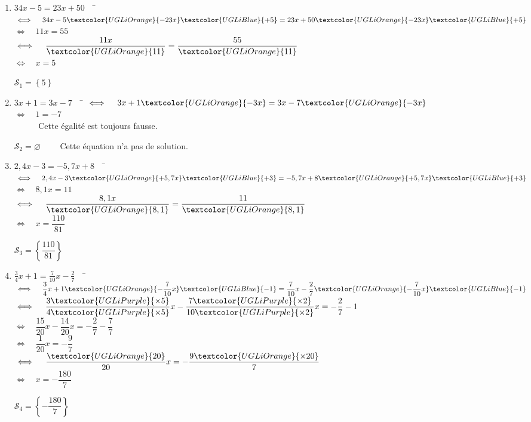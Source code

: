 \documentclass[a4paper,11pt,exos]{nsi} %
\begin{document}
\begin{enumerate}
    \item \begin{tabbing}
        $34x-5=23x+50 \quad$  \=  $\iff \quad 34x-5\textcolor{UGLiOrange}{-23x}\textcolor{UGLiBlue}{+5}=23x+50\textcolor{UGLiOrange}{-23x}\textcolor{UGLiBlue}{+5}$\\
        \>  $\iff \quad 11x=55$\\
        \>  $\iff \quad \dfrac{11x}{\textcolor{UGLiOrange}{11}}=\dfrac{55}{\textcolor{UGLiOrange}{11}}$\\
        \>  $\iff \quad x=5$
    \end{tabbing}
    $\mathcal{S}_1=\left\{5\right\}$

    \item \begin{tabbing}
        $3x+1 = 3x -7 \quad$ \= $\iff \quad 3x+1 \textcolor{UGLiOrange}{-3x}= 3x -7 \textcolor{UGLiOrange}{-3x}$\\
        \>  $\iff \quad 1=-7$\\
        \>  $\phantom{\iff} \quad$ Cette égalité est toujours fausse.
    \end{tabbing}
    $\mathcal{S}_2=\varnothing \qquad$ Cette équation n'a pas de solution.

    \item \begin{tabbing}
        $2,4x-3=-5,7x+8 \quad$  \=  $\iff\quad 2,4x-3\textcolor{UGLiOrange}{+5,7x}\textcolor{UGLiBlue}{+3}=-5,7x+8\textcolor{UGLiOrange}{+5,7x}\textcolor{UGLiBlue}{+3}$\\
        \>  $\iff\quad 8,1x=11$\\
        \>  $\iff\quad  \dfrac{8,1x}{\textcolor{UGLiOrange}{8,1}}=\dfrac{11}{\textcolor{UGLiOrange}{8,1}}$\\
        \>  $\iff\quad x=\dfrac{110}{81}$
    \end{tabbing}
    $\mathcal{S}_3=\left\{\dfrac{110}{81}\right\}$

    \item \begin{tabbing}
        $\displaystyle\frac{3}{4}x+1=\frac{7}{10}x-\frac{2}{7}\quad$ \= 
        $\iff\quad \displaystyle\frac{3}{4}x+1 \textcolor{UGLiOrange}{-\dfrac{7}{10}x}\textcolor{UGLiBlue}{-1}=\frac{7}{10}x-\frac{2}{7}\textcolor{UGLiOrange}{-\dfrac{7}{10}x}\textcolor{UGLiBlue}{-1}$\\[.5em]
        \>  $\iff\quad \dfrac{3\textcolor{UGLiPurple}{\times 5}}{4\textcolor{UGLiPurple}{\times 5}}x-\dfrac{7\textcolor{UGLiPurple}{\times 2}}{10\textcolor{UGLiPurple}{\times 2}}x=-\dfrac{2}{7}-1$\\[.5em]
        \>  $\iff\quad \dfrac{15}{20}x-\dfrac{14}{20}x=-\dfrac{2}{7}-\dfrac{7}{7}$\\[.5em]
        \>  $\iff\quad \dfrac{1}{20}x=-\dfrac{9}{7}$\\[.5em]
        \>  $\iff\quad \dfrac{\textcolor{UGLiOrange}{20}}{20}x=-\dfrac{9\textcolor{UGLiOrange}{\times20}}{7}$\\[.5em]
        \>  $\iff\quad x=-\dfrac{180}{7}$
    \end{tabbing}
    $\mathcal{S}_4=\left\{-\dfrac{180}{7}\right\}$


\end{enumerate}
\end{document}
